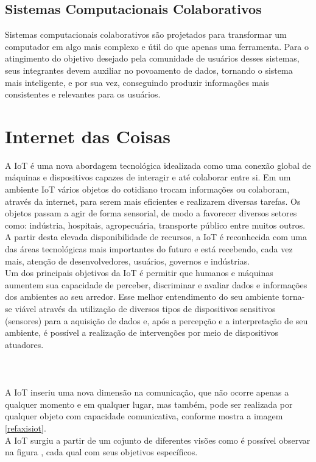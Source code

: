 \subsection{Sistemas Computacionais Colaborativos}
\quad Sistemas computacionais colaborativos são projetados para transformar um computador em algo mais complexo e útil do que apenas uma ferramenta.
Para o atingimento do objetivo desejado pela comunidade de usuários desses sistemas, seus integrantes devem auxiliar no povoamento de dados,
tornando o sistema mais inteligente, e por sua vez, conseguindo produzir informações mais consistentes e relevantes para os usuários.

\section{Internet das Coisas}%
\quad
A \acrlong{IoT} é uma nova abordagem tecnológica idealizada como uma conexão global
de máquinas e dispositivos capazes de interagir e até colaborar entre si. Em um ambiente \acrshort{IoT} vários objetos do cotidiano trocam informações
ou colaboram, através da internet, para serem mais eficientes e realizarem diversas tarefas.
Os objetos passam a agir de forma sensorial, de modo a favorecer diversos setores como:
indústria, hospitais, agropecuária, transporte público entre muitos outros. A partir desta
elevada disponibilidade de recursos, a \acrshort{IoT} é reconhecida com uma das áreas tecnológicas mais importantes
do futuro e está recebendo, cada vez mais, atenção de desenvolvedores, usuários, governos e indústrias.
\\ \null
\quad
Um dos principais objetivos da \acrlong{IoT} é permitir
que humanos e máquinas aumentem sua capacidade de perceber, discriminar e avaliar dados e informações dos ambientes ao seu arredor.
 Esse melhor entendimento do seu ambiente torna-se viável através da utilização
 de diversos tipos de dispositivos sensitivos (sensores) para a aquisição de dados e, após a percepção e a interpretação
 de seu ambiente, é possível a realização de intervenções por meio de dispositivos atuadores. \\\\\\\\ \null
 \quad A \acrshort{IoT}
 inseriu uma nova dimensão na comunicação, que não ocorre apenas a qualquer momento e em qualquer lugar, mas também, pode ser realizada por qualquer objeto
 com capacidade comunicativa, conforme mostra a imagem \ref{refaxisiot}.
\\ \null
 \quad
 A \acrlong{IoT} surgiu a partir de um cojunto de diferentes visões como é possível observar na figura , cada qual com seus objetivos específicos.
 \pagebreak

